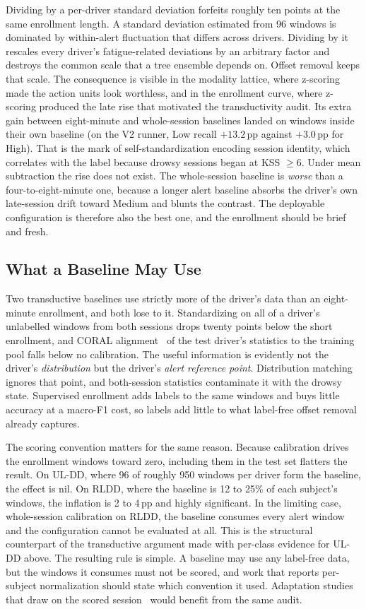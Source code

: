 \documentclass[journal]{IEEEtran}
\newcommand{\pp}{\,pp}
\begin{document}
Dividing by a per-driver standard deviation forfeits roughly ten points at
the same enrollment length. A standard deviation estimated from 96 windows is
dominated by within-alert fluctuation that differs across drivers. Dividing by
it rescales every driver's fatigue-related deviations by an arbitrary factor
and destroys the common scale that a tree ensemble depends on. Offset removal
keeps that scale. The consequence is visible in the modality lattice, where
z-scoring made the action units look worthless, and in the enrollment curve,
where z-scoring produced the late rise that motivated the transductivity
audit. Its extra gain between eight-minute and whole-session baselines landed
on windows inside their own baseline (on the V2 runner, Low recall
$+13.2$\pp{} against $+3.0$\pp{} for High). That is the mark of
self-standardization encoding session identity, which correlates with the
label because drowsy sessions began at KSS $\ge 6$. Under mean subtraction
the rise does not exist. The whole-session baseline is \emph{worse} than a
four-to-eight-minute one, because a longer alert baseline absorbs the driver's
own late-session drift toward Medium and blunts the contrast. The deployable
configuration is therefore also the best one, and the enrollment should be
brief and fresh.

\subsection{What a Baseline May Use}
\label{sec:baselineuse}
Two transductive baselines use strictly more of the driver's data than an
eight-minute enrollment, and both lose to it. Standardizing on all of a
driver's unlabelled windows from both sessions drops twenty points below the
short enrollment, and CORAL alignment~\cite{sun2016coral} of the test
driver's statistics to the training pool falls below no calibration. The
useful information is evidently not the driver's \emph{distribution} but the
driver's \emph{alert reference point}. Distribution matching ignores that
point, and both-session statistics contaminate it with the drowsy state.
Supervised enrollment adds labels to the same windows and buys little accuracy
at a macro-F1 cost, so labels add little to what label-free offset removal
already captures.

The scoring convention matters for the same reason. Because calibration
drives the enrollment windows toward zero, including them in the test set
flatters the result. On UL-DD, where 96 of roughly 950 windows per driver form
the baseline, the effect is nil. On RLDD, where the baseline is 12 to 25\% of
each subject's windows, the inflation is 2 to 4\pp{} and highly significant.
In the limiting case, whole-session calibration on RLDD, the baseline consumes
every alert window and the configuration cannot be evaluated at all. This is
the structural counterpart of the transductive argument made with per-class
evidence for UL-DD above. The resulting rule is simple. A baseline may use any
label-free data, but the windows it consumes must not be scored, and work that
reports per-subject normalization should state which convention it used.
Adaptation studies that draw on the scored
session~\cite{aravinth2025dynamic,liu2020intersubject} would benefit from the
same audit.
\end{document}
